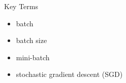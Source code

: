 \documentclass{beamer}
\begin{document}
\begin{frame}{Key Terms}
\begin{itemize}
    \item batch
    \item batch size
    \item mini-batch
    \item stochastic gradient descent (SGD)
\end{itemize}

\end{frame}
\end{document}
